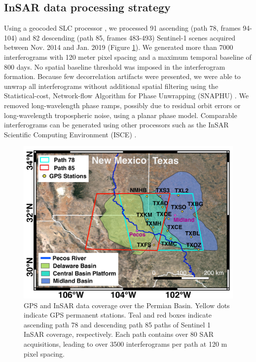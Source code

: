 \subsection{InSAR data processing strategy}
\label{sec:InSARprocessing}
Using a geocoded SLC processor \citep{Zheng2017PhaseCorrectionSingle, Zebker2017UserFriendlyInsar}, we processed 91 ascending (path 78, frames 94-104) and 82 descending (path 85, frames 483-493) Sentinel-1 scenes acquired between Nov. 2014 and Jan. 2019 (Figure \ref{fig:paper1-study-area}). We generated more than 7000 interferograms with 120 meter pixel spacing and a maximum temporal baseline of 800 days. No spatial baseline threshold was imposed in the interferogram formation. Because few decorrelation artifacts were presented, we were able to unwrap all interferograms without additional spatial filtering using the Statistical-cost, Network-flow Algorithm for Phase Unwrapping (SNAPHU) \citep{Chen2001TwoDimensionalPhase}. We removed long-wavelength phase ramps, possibly due to residual orbit errors or long-wavelength tropospheric noise, using a planar phase model. Comparable interferograms can be generated using other processors such as the InSAR Scientific Computing Environment (ISCE) \citep{Rosen2012InsarScientificComputing}. 


\begin{figure}[hbt!]
	\centering
	\includegraphics[width=0.9\linewidth]{paper1-permian/figures/figure1-study-area.pdf}
	\caption[GPS and InSAR data coverage over the Permian Basin.]{GPS and InSAR data coverage over the Permian Basin. Yellow dots indicate GPS permanent stations. Teal and red boxes indicate ascending path 78 and descending path 85 paths of Sentinel 1 InSAR coverage, respectively. Each path contains over 80 SAR acquisitions, leading to over 3500 interferograms per path at 120 m pixel spacing.}
	\label{fig:paper1-study-area}
\end{figure}


